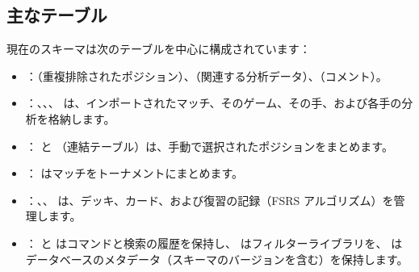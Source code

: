 \documentclass[letterpaper,10pt,dvipdfmx]{sphinxmanual}
\begin{document}
\subsection{主なテーブル}
\label{\detokenize{annexe_db_scheme:principales-tables}}
\sphinxAtStartPar
現在のスキーマは次のテーブルを中心に構成されています：
\begin{itemize}
\item {} 
\sphinxAtStartPar
{} ：（重複排除されたポジション）、（関連する分析データ）、（コメント）。

\item {} 
\sphinxAtStartPar
{} ：、、、 は、インポートされたマッチ、そのゲーム、その手、および各手の分析を格納します。

\item {} 
\sphinxAtStartPar
{} ： と （連結テーブル）は、手動で選択されたポジションをまとめます。

\item {} 
\sphinxAtStartPar
{} ： はマッチをトーナメントにまとめます。

\item {} 
\sphinxAtStartPar
{} ：、、 は、デッキ、カード、および復習の記録（FSRS アルゴリズム）を管理します。

\item {} 
\sphinxAtStartPar
{} ： と  はコマンドと検索の履歴を保持し、 はフィルターライブラリを、 はデータベースのメタデータ（スキーマのバージョンを含む）を保持します。

\end{itemize}
\end{document}
